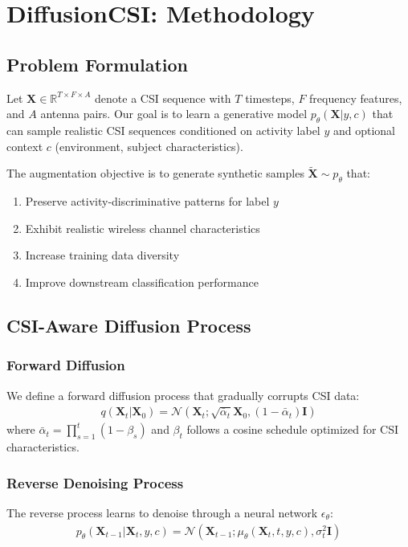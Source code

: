\documentclass[journal]{IEEEtran}
\begin{document}
\section{DiffusionCSI: Methodology}

\subsection{Problem Formulation}

Let $\mathbf{X} \in \mathbb{R}^{T \times F \times A}$ denote a CSI sequence with $T$ timesteps, $F$ frequency features, and $A$ antenna pairs. Our goal is to learn a generative model $p_\theta(\mathbf{X}|y, c)$ that can sample realistic CSI sequences conditioned on activity label $y$ and optional context $c$ (environment, subject characteristics).

The augmentation objective is to generate synthetic samples $\tilde{\mathbf{X}} \sim p_\theta$ that:
\begin{enumerate}
\item Preserve activity-discriminative patterns for label $y$
\item Exhibit realistic wireless channel characteristics
\item Increase training data diversity
\item Improve downstream classification performance
\end{enumerate}

\subsection{CSI-Aware Diffusion Process}

\subsubsection{Forward Diffusion}
We define a forward diffusion process that gradually corrupts CSI data:
\begin{align}
q(\mathbf{X}_t|\mathbf{X}_0) = \mathcal{N}(\mathbf{X}_t; \sqrt{\bar{\alpha}_t}\mathbf{X}_0, (1-\bar{\alpha}_t)\mathbf{I})
\end{align}
where $\bar{\alpha}_t = \prod_{s=1}^t (1-\beta_s)$ and $\beta_t$ follows a cosine schedule optimized for CSI characteristics.

\subsubsection{Reverse Denoising Process}
The reverse process learns to denoise through a neural network $\epsilon_\theta$:
\begin{align}
p_\theta(\mathbf{X}_{t-1}|\mathbf{X}_t, y, c) = \mathcal{N}(\mathbf{X}_{t-1}; \mu_\theta(\mathbf{X}_t, t, y, c), \sigma_t^2\mathbf{I})
\end{align}
\end{document}
